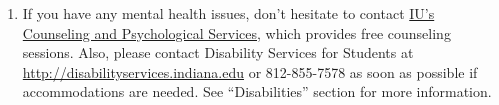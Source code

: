 \documentclass[11pt,article,oneside]{memoir} %
\begin{document}
\begin{enumerate}



\item If you have any mental health issues, don't hesitate to contact \href{http://healthcenter.indiana.edu/counseling/index.shtml}{IU's Counseling and Psychological Services}, which provides free counseling sessions. Also, please contact Disability Services for Students at \url{http://disabilityservices.indiana.edu} or 812-855-7578 as soon as possible if accommodations are needed. See ``Disabilities'' section for more information. 


\end{enumerate}%
\end{document}
